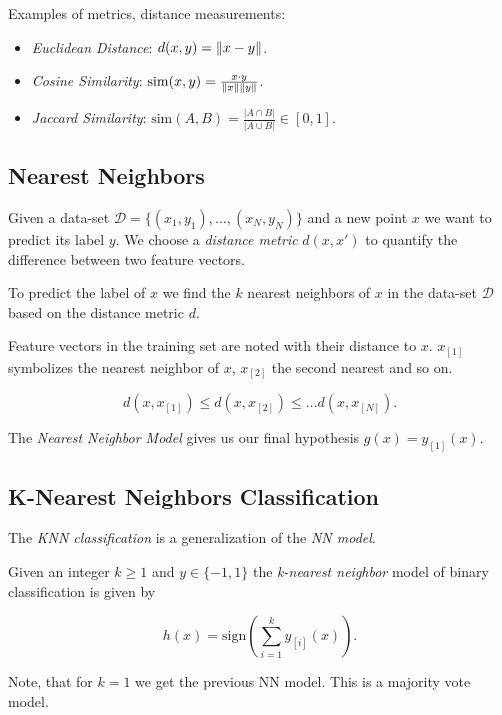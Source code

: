Examples of metrics, distance measurements:

\begin{itemize}

    \item \emph{Euclidean Distance}: \( d(x ,y) = \left\| x - y \right\|\).

    \item \emph{Cosine Similarity}: \( \mathrm{sim}(x, y) = \frac{x \cdot y}{\left\| x \right\| \left\| y \right\|} \).

    \item \emph{Jaccard Similarity}: \( \mathrm{sim}(A, B) = \frac{|A \cap B|}{|A \cup B|} \in [0, 1] \).

\end{itemize}

\subsection{Nearest Neighbors}

Given a data-set \(\mathcal{D} = \{(x_1, y_1), \dots, (x_N, y_N)\}\) and a new point \(x\) we want to predict its label \(y\).
We choose a \emph{distance metric} \(d(x, x')\) to quantify the difference between two feature vectors.

To predict the label of \(x\) we find the \(k\) nearest neighbors of \(x\) in the data-set \(\mathcal{D}\) based on the distance metric \(d\).

Feature vectors in the training set are noted with their distance to \(x\). \(x_{[1]}\) symbolizes the nearest neighbor of
\(x\), \(x_{[2]}\) the second nearest and so on.

\[
	d(x, x_{[1]}) \le d(x, x_{[2]}) \le \dots d(x, x_{[N]}).
\]

The \emph{Nearest Neighbor Model} gives us our final hypothesis \(g(x) = y_{[1]}(x)\).

\subsection{K-Nearest Neighbors Classification}

The \emph{KNN classification} is a generalization of the \emph{NN model}.

Given an integer \(k \ge 1\) and \(y \in \{-1, 1\}\) the \emph{k-nearest neighbor} model of binary classification is given by

\[
	h(x) = \mathrm{sign} \left(\sum_{i = 1}^{k} y_{[i]}(x)\right).
\]

Note, that for \(k = 1\) we get the previous NN model. This is a majority vote model.

